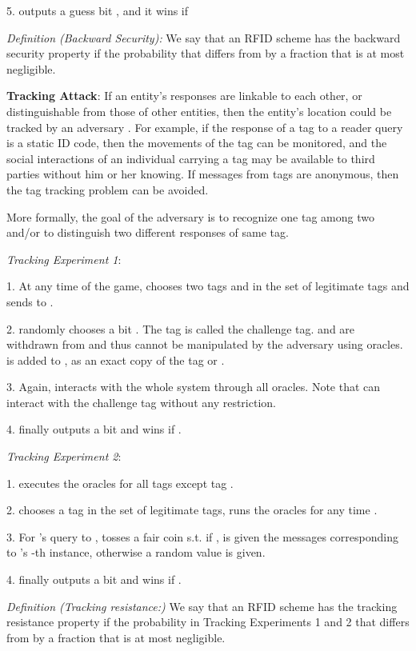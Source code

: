 \documentclass{easychair}
\begin{document}
5.  outputs a guess bit , and it wins if 

\textit{Definition (Backward Security):} We say that an RFID scheme has the backward security property if the probability that  differs from  by a fraction that is at most negligible.


\textbf{Tracking Attack}: If an entity's responses are linkable to each other, or
distinguishable from those of other entities, then the entity's location could 
be tracked by an adversary \cite{song, sm:bp}. For example, if
the response of a tag to a reader query is a static ID
code, then the movements of the tag can be monitored,
and the social interactions of an individual carrying a
tag may be available to third parties without him or
her knowing. If messages from tags are anonymous,
then the tag tracking problem can be avoided.

More formally, the goal
of the adversary  is to recognize one tag among two and/or to distinguish two different responses of same tag.

\textit{Tracking Experiment 1}:

1. At any time of the game,  chooses two tags  and  in the set of
legitimate tags and sends  to .

2.  randomly chooses a bit . The tag  is called the challenge tag. 
and  are withdrawn from  and thus cannot be manipulated by the
adversary using oracles.  is added to , as an exact copy of the tag
 or .

3. Again,  interacts with the whole system through all oracles. Note that 
can interact with the challenge tag without any restriction.

4.  finally outputs a bit  and wins if .

\textit{Tracking Experiment 2}:

1.  executes the oracles for all  tags except tag .

2.  chooses a tag  in the set of
legitimate tags, runs the oracles for any time .

3. For 's query to ,  tosses a fair coin  s.t. if ,  is given the messages corresponding to 's -th instance, otherwise a random value is given.

4.  finally outputs a bit  and wins if .

\textit{Definition (Tracking resistance:)} We say that an RFID scheme has the tracking resistance property if the probability in Tracking Experiments 1 and 2 that  differs from  by a fraction that is at most negligible.
\end{document}
